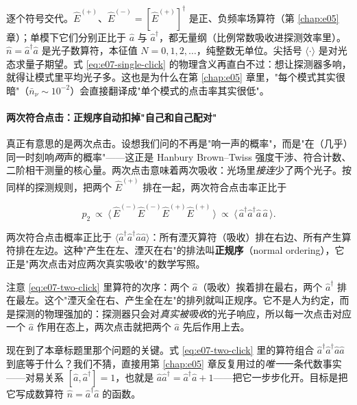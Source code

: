 逐个符号交代。\(\hat E^{(+)}\)、\(\hat E^{(-)}=[\hat E^{(+)}]^\dagger\) 是正、负频率场算符（第 \ref{chap:e05} 章）；单模下它们分别正比于 \(\hat a\) 与 \(\hat a^\dagger\)，都无量纲（比例常数吸收进探测效率里）。\(\hat n=\hat a^\dagger\hat a\) 是光子数算符，本征值 \(N=0,1,2,\dots\)，纯整数无单位。尖括号 \(\langle\cdot\rangle\) 是对光态求量子期望。式 \eqref{eq:e07-single-click} 的物理含义再直白不过：想让探测器多响，就得让模式里平均光子多。这也是为什么在第 \ref{chap:e05} 章里，"每个模式其实很暗"（\(\bar n_\nu\sim10^{-2}\)）会直接翻译成"单个模式的点击率其实很低"。

\paragraph{两次符合点击：正规序自动扣掉"自己和自己配对"}
\label{sec:e07-normal-ordering}

真正有意思的是两次点击。设想我们问的不再是"响一声的概率"，而是"在（几乎）同一时刻响\emph{两}声的概率"——这正是 Hanbury Brown--Twiss 强度干涉、符合计数、二阶相干测量的核心量。两次点击意味着两次吸收：光场里\emph{接连}少了两个光子。按同样的探测规则，把两个 \(\hat E^{(+)}\) 排在一起，两次符合点击率正比于

\begin{equation}
  p_2\ \propto\ \big\langle\,\hat E^{(-)}\hat E^{(-)}\hat E^{(+)}\hat E^{(+)}\,\big\rangle
  \ \propto\ \big\langle\,\hat a^\dagger\hat a^\dagger\hat a\,\hat a\,\big\rangle .
  \label{eq:e07-two-click}
\end{equation}
\begin{formulaexplain}
两次符合点击概率正比于 \(\langle\hat a^\dagger\hat a^\dagger\hat a\hat a\rangle\)：所有湮灭算符（吸收）排在右边、所有产生算符排在左边。这种"产生在左、湮灭在右"的排法叫\textbf{正规序}（normal ordering），它正是"两次点击对应两次真实吸收"的数学写照。
\end{formulaexplain}

注意 \eqref{eq:e07-two-click} 里算符的次序：两个 \(\hat a\)（吸收）挨着排在最右，两个 \(\hat a^\dagger\) 排在最左。这个"湮灭全在右、产生全在左"的排列就叫正规序。它不是人为约定，而是探测的物理强加的：探测器只会对\emph{真实被吸收}的光子响应，所以每一次点击对应一个 \(\hat a\) 作用在态上，两次点击就把两个 \(\hat a\) 先后作用上去。

现在到了本章标题里那个问题的关键。式 \eqref{eq:e07-two-click} 里的算符组合 \(\hat a^\dagger\hat a^\dagger\hat a\hat a\) 到底等于什么？我们不猜，直接用第 \ref{chap:e05} 章反复用过的\emph{唯一}一条代数事实——对易关系 \([\hat a,\hat a^\dagger]=1\)，也就是 \(\hat a\hat a^\dagger=\hat a^\dagger\hat a+1\)——把它一步步化开。目标是把它写成数算符 \(\hat n=\hat a^\dagger\hat a\) 的函数。

